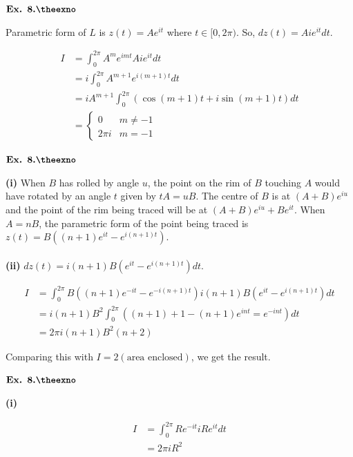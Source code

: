 \documentclass{article}
\def\tf{\textbf}
\newcounter{exno}
\begin{document}
\vspace{0.2in}

${\textbf{Ex. 8.\theexno}}$\addtocounter{exno}{1}
Parametric form of $L$ is $z(t) = Ae^{it}$ where $t \in [0,2\pi)$. So, $dz(t) = Aie^{it}dt$.

\begin{align*}
    I &= \int_{0}^{2\pi}A^{m}e^{imt}Aie^{it}dt\\
    &= i\int_{0}^{2\pi}A^{m+1}e^{i(m+1)t}dt\\
    &= iA^{m+1}\int_{0}^{2\pi}(\cos(m+1)t + i \sin(m+1)t) dt\\
    &= \left\{\begin{matrix}0&m\neq -1\\2\pi i & m = -1\end{matrix}\right.
\end{align*}

\vspace{0.2in}

${\textbf{Ex. 8.\theexno}}$\addtocounter{exno}{1}
\tf{(i)} When $B$ has rolled by angle $u$, the point on the rim of $B$ touching $A$ would have rotated by an angle $t$ given by $tA = uB$. The centre of $B$ is at $(A+B)e^{iu}$ and the point of the rim being traced will be at $(A+B)e^{iu} + Be^{it}$. When $A=nB$, the parametric form of the point being traced is $z(t) = B((n+1)e^{it}-e^{i(n+1)t})$.\\~\\

\tf{(ii)} $dz(t) = i(n+1)B(e^{it}-e^{i(n+1)t})dt$.

\begin{align*}
I &= \int_{0}^{2\pi} B((n+1)e^{-it}-e^{-i(n+1)t})i(n+1)B(e^{it}-e^{i(n+1)t})dt\\
&= i(n+1)B^2\int_{0}^{2\pi}((n+1) + 1 - (n+1)e^{int} = e^{-int})dt\\
&= 2\pi i(n+1)B^2(n+2)
\end{align*}

Comparing this with $I = 2(\text{area enclosed})$, we get the result.

\vspace{0.2in}

${\textbf{Ex. 8.\theexno}}$\addtocounter{exno}{1}
\tf{(i)}

\begin{align*}
    I &= \int_{0}^{2\pi}Re^{-it}iRe^{it}dt\\
    &= 2\pi i R^2
\end{align*}
\end{document}
